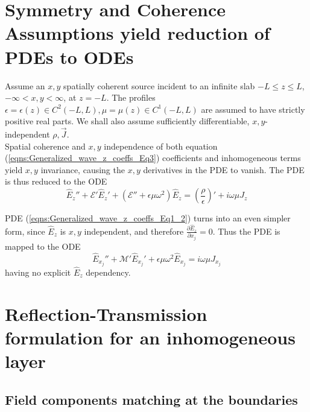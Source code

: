 \documentclass[twocolumn,secnumarabic,amssymb, nobibnotes, aps, prd]{revtex4-1}
\begin{document}
\section{Symmetry and Coherence Assumptions yield reduction of PDEs to ODEs}

Assume an $x,y$ spatially coherent source incident to an infinite slab $-L \leq z \leq L$, $-\infty <x,y<\infty$, at $z=-L$. The profiles $\epsilon = \epsilon(z) \in C^{2}(-L,L), \mu=\mu(z)\in C^1(-L,L)$ are assumed to have strictly positive real parts. We shall also assume sufficiently differentiable, $x,y$-independent $\rho, \overrightarrow{J}$.\\

Spatial coherence and $x,y$ independence of both equation (\ref{eqns:Generalized_wave_z_coeffs_Eq3}) coefficients and inhomogeneous terms yield $x,y$ invariance, causing the $x,y$ derivatives in the PDE  to vanish. The PDE is thus reduced to the ODE
\begin{equation}
\hat{E}_z'' + \mathcal{E}' \hat{E}_z' + \left( \mathcal{E}'' + \epsilon \mu \omega^2 \right)\hat{E}_z   = \left( \frac{\rho}{\epsilon}\right)' + i \omega \mu J_z
\label{eqns:ODE_z_inhom}
\end{equation}

PDE (\ref{eqns:Generalized_wave_z_coeffs_Eq1_2})  turns into an even simpler form, since $\hat{E}_z$ is $x,y$ independent, and therefore  $\frac{\partial \hat{E}_z}{\partial {x_j}}=0$. Thus the  PDE is mapped to the ODE  
\begin{equation}
 \hat{E}_{x_j}''+\mathcal{M}' \hat{E}_{x_j}'  +\epsilon \mu \omega^2 \hat{E}_{x_j} = i \omega\mu J_{x_j}
\label{eqns:ODE_xy_inhom}
\end{equation}
having no explicit $\hat{E}_z$ dependency.

\section{Reflection-Transmission formulation for an inhomogeneous layer}
 

\subsection{Field components matching at the boundaries}
\end{document}
